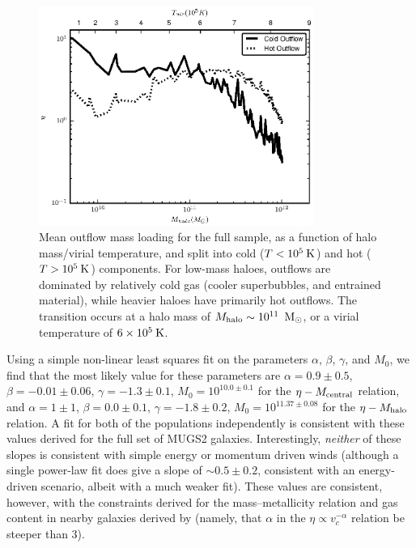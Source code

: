 \begin{figure}
    \includegraphics[width=0.8\textwidth]{figures3/coldmassloading.eps}
    \caption[Outflow mass loading for cold and hot gas]{Mean outflow mass loading for the full sample, as a function of
    halo mass/virial temperature, and split into cold ($T<10^5\>{\rm K}$) and hot
    ($T>10^5\>{\rm K}$) components.  For low-mass haloes, outflows are dominated by
    relatively cold gas (cooler superbubbles, and entrained material), while heavier
    haloes have primarily hot outflows.  The transition occurs at a halo mass of
    $M_{\rm halo}\sim10^{11}\;\>{\rm M_{\odot}}$, or a virial temperature of $6\times10^5\>{\rm K}$.}
    \label{coldmassloading3}
\end{figure}

Using a simple non-linear least squares fit on the parameters $\alpha$,
$\beta$, $\gamma$, and $M_0$, we find that the most likely value for these
parameters are $\alpha=0.9\pm0.5$, $\beta=-0.01\pm0.06$, $\gamma=-1.3\pm0.1$,
$M_{0}=10^{10.0\pm0.1}$ for the $\eta-M_{\rm central}$ relation, and $\alpha=1\pm1$,
$\beta=0.0\pm0.1$, $\gamma=-1.8\pm0.2$, $M_{0}=10^{11.37\pm0.08}$ for the
$\eta-M_{\rm halo}$ relation.  A fit for both of the populations independently is
consistent with these values derived for the full set of MUGS2 galaxies.
Interestingly, {\it neither} of these slopes is consistent with simple energy
or momentum driven winds (although a single power-law fit does give a slope of
$\sim0.5\pm0.2$, consistent with an energy-driven scenario, albeit with a much
weaker fit).  These values are consistent, however, with the constraints derived
for the mass--metallicity relation and gas content in nearby galaxies derived by
\citet{Peeples2011} (namely, that $\alpha$ in the $\eta\propto v_c^{-\alpha}$
relation be steeper than 3).

